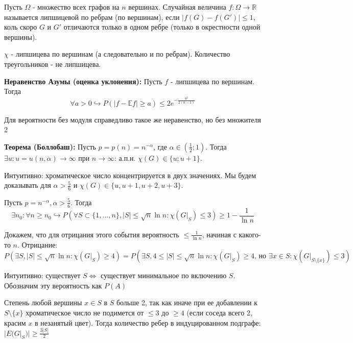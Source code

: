 \par \Def Пусть $\Omega$ - множество всех графов на $n$ вершинах. Случайная величина $f: \Omega \rightarrow \mathbb{R}$ называется липшицевой по ребрам (по вершинам), если $|f(G)-f(G')|\leq 1$, коль скоро $G$ и $G'$ отличаются только в одном ребре (только в окрестности одной вершины).

\par \Example $\chi$ - липшицева по вершинам (а следовательно и по ребрам). Количество треугольников - не липшицева.

\par \textbf{Неравенство Азумы (оценка уклонения):} Пусть $f$ - липшицева по вершинам. Тогда $$\forall a > 0 \hookrightarrow P(|f-\mathbb{E}f| \geq a) \leq 2e^{-\frac{a^2}{2(n-1)}}$$

\par \Note Для вероятности без модуля справедливо такое же неравенство, но без множителя 2

\par \textbf{Теорема (Боллобаш):} Пусть $p=p(n)=n^{-\alpha}$, где $\alpha \in \left(\frac{1}{2}; 1\right)$. Тогда $\exists u: u = u(n, \alpha)\rightarrow \infty$ при $n\rightarrow\infty$: а.п.н. $\chi(G) \in \{u; u+1\}$.

\par \Note Интуитивно: хроматическое число концентрируется в двух значениях. Мы будем доказывать для $\alpha > \frac{5}{6}$ и $\chi(G) \in \{u, u+1, u+2, u+3\}$.

\par \Lemma Пусть $p=n^{-\alpha}, \alpha>\frac{5}{6}$. Тогда $$\exists n_0: \forall n \geq n_0 \hookrightarrow P(\forall S \subset \{1, \ldots, n\}, |S|\leq \sqrt{n}\ln{n}: \chi(G|_S) \leq 3) \geq 1-\frac{1}{\ln{n}}$$

\par \Proof Докажем, что для отрицания этого события вероятность $\leq \frac{1}{\ln{n}}$, начиная с какого-то $n$. Отрицание: $$P(\exists S, |S| \leq \sqrt{n}\ln{n}: \chi(G|_S) \geq 4)=P(\exists S, 4 \leq |S| \leq \sqrt{n}\ln{n}: \chi(G|_S) \geq 4 \text{, но }\exists x \in S: \chi(G|_{S\setminus \{x\}}) \leq 3)$$ \par Интуитивно: существует $S \Leftrightarrow$ существует минимальное по включению $S$. Обозначим эту вероятность как $P(A)$

\par Степень любой вершины $x \in S$ в $S$ больше 2, так как иначе при ее добавлении к $S\setminus \{x\}$ хроматическое число не подимется от $\leq 3$ до $\geq 4$ (если соседа всего 2, красим $x$ в незанятый цвет). Тогда количество ребер в индуцированном подграфе: $|E(G|_S)|\geq \frac{3|S|}{2}$

